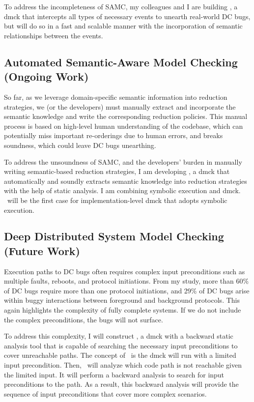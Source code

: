 \documentclass[11pt]{article}
\begin{document}
To address the incompleteness of SAMC, my colleagues and I are building
\fullcheck, a dmck that intercepts all types of necessary events to unearth
real-world DC bugs, but will do so in a fast and scalable manner with the
incorporation of semantic relationships between the events.
\fi

\subsection{Automated Semantic-Aware Model Checking (Ongoing Work)} 

So far, as we leverage domain-specific semantic information into reduction
strategies, we (or the developers) must manually extract and incorporate the
semantic knowledge and write the corresponding reduction policies. This manual
process is based on high-level human understanding of the codebase, which can
potentially miss important re-orderings due to human errors, and breaks
soundness, which could leave DC bugs unearthing.

To address the unsoundness of SAMC, and the developers' burden in manually
writing semantic-based reduction strategies, I am developing \autocheck, a dmck
that automatically and soundly extracts semantic knowledge into reduction
strategies with the help of static analysis. I am combining symbolic execution
and dmck. \autocheck\ will be the first case for implementation-level dmck that
adopts symbolic execution. 

\subsection{Deep Distributed System Model Checking (Future Work)}

Execution paths to DC bugs often requires complex input preconditions such as
multiple faults, reboots, and protocol initiations. From my study, more than
60\% of DC bugs require more than one protocol initiations, and 29\% of DC bugs
arise within buggy interactions between foreground and background protocols.
This again highlights the complexity of fully complete systems. If we do not
include the complex preconditions, the bugs will not surface.

To address this complexity, I will construct \deepcheck, a dmck with a backward
static analysis tool that is capable of searching the necessary input
preconditions to cover unreachable paths. The concept of \deepcheck\ is the dmck
will run with a limited input precondition. Then, \deepcheck\ will analyze which
code path is not reachable given the limited input. It will perform a backward
analysis to search for input preconditions to the path. As a result, this
backward analysis will provide the sequence of input preconditions that cover
more complex scenarios.
\end{document}
